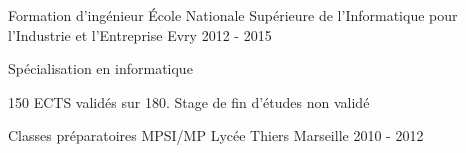 
\begin{cventries}



\cventry
{Formation d'ingénieur}
{\'Ecole Nationale Supérieure de l'Informatique pour l'Industrie et l'Entreprise}
{Evry}
{2012 - 2015}
{
	\begin{cvitems}
	\item{Spécialisation en informatique}
	\item{150 ECTS validés sur 180. Stage de fin d'études non validé}
	\end{cvitems}
}

\cventry
{Classes préparatoires MPSI/MP}
{Lycée Thiers}
{Marseille}
{2010 - 2012}
{}

\end{cventries}